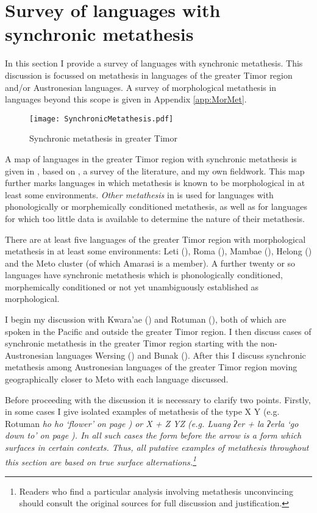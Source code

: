\section{Survey of languages with synchronic metathesis}\label{sec:SurLanMet}
In this section I provide a survey of
languages with synchronic metathesis.
This discussion is focussed on metathesis in languages
of the greater Timor region and/or Austronesian languages.
A survey of morphological metathesis in languages beyond this scope
is given in Appendix \ref{app:MorMet}.

\begin{figure}[h]
	\caption{Synchronic metathesis in greater Timor}\label{fig:CVMetTimReg}
	\texttt{[image: SynchronicMetathesis.pdf]}
\end{figure}

A map of languages in the greater Timor region
with synchronic metathesis is given in ,
based on \citet[135ff]{sc15}, a survey of the literature,
and my own fieldwork.
This map further marks languages in which metathesis
is known to be morphological in at least some environments.
\emph{Other metathesis} in  is used for languages
with phonologically or morphemically conditioned metathesis,
as well as for languages for which too little data is available
to determine the nature of their metathesis.

There are at least five languages of the greater Timor region
with morphological metathesis in at least some environments:
Leti (), Roma (), Mambae (),
Helong () and the Meto cluster (of which Amarasi is a member).
A further twenty or so languages have synchronic
metathesis which is phonologically conditioned,
morphemically conditioned or not yet unambiguously established as morphological.

I begin my discussion with Kwara'ae ()
and Rotuman (), both of which are spoken in the Pacific
and outside the greater Timor region.
I then discuss cases of synchronic metathesis
in the greater Timor region starting with the non-Austronesian
languages Wersing () and Bunak ().
After this I discuss synchronic metathesis among Austronesian
languages of the greater Timor region moving geographically
closer to Meto with each language discussed.

Before proceeding with the discussion
it is necessary to clarify two points.
Firstly, in some cases I give isolated examples of metathesis
of the type X {\ra} Y
(e.g. Rotuman \it{ho} {\ra} \it{ho}
`flower' on page \pageref{ex:VCV->VVC})
or X + Z {\ra} YZ (e.g. Luang \it{ʔer} + \it{la}
{\ra} \it{ʔerla} `go down to' on page \pageref{ex:LuaMet}).
In all such cases the form before the arrow is
a form which surfaces in certain contexts.
Thus, all putative examples of metathesis throughout this section
are based on true surface alternations.\footnote{
		Readers who find a particular analysis involving metathesis
		unconvincing should consult the original sources for full
		discussion and justification.}

